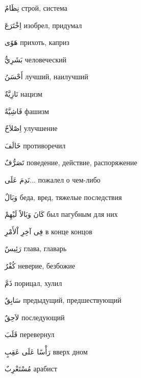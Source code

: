 \documentclass[a5paper]{article}
\newcommand\textstyleDropCaps[1]{#1}
\newcommand\textstyleCaptioncharacters[1]{#1}
\begin{document}
\textstyleCaptioncharacters{نِظَامٌ }\textstyleDropCaps{строй, система‎}

\textstyleCaptioncharacters{اِخْتَرَعَ }\textstyleDropCaps{изобрел, придумал‎}

\textstyleCaptioncharacters{هَوًى }\textstyleDropCaps{прихоть, каприз‎}

\textstyleCaptioncharacters{بَشَرِيٌّ }\textstyleDropCaps{человеческий‎}

\textstyleCaptioncharacters{أَحْسَنُ }\textstyleDropCaps{лучший, наилуч­ший‎}

\textstyleCaptioncharacters{نَازِيَّةٌ }\textstyleDropCaps{нацизм‎}

\textstyleCaptioncharacters{فَاشِيَّةٌ }\textstyleDropCaps{фашизм‎}

\textstyleCaptioncharacters{اِصْلاَحٌ }\textstyleDropCaps{улучшение‎}

\textstyleCaptioncharacters{خَالَفَ }\textstyleDropCaps{противоречил‎}

\textstyleCaptioncharacters{تَصَرُّفٌ }\textstyleDropCaps{поведение, дей­ствие, распоряжение‎}

\textstyleCaptioncharacters{نَدِمَ عَلَى... }\textstyleDropCaps{пожалел о чем-либо‎}

\textstyleCaptioncharacters{وَبَالٌ }\textstyleDropCaps{беда, вред, тяжелые последствия‎}

\textstyleCaptioncharacters{كَانَ وَبَالاً لَيْهِمْ }\textstyleDropCaps{был па­губным для них‎}

\textstyleCaptioncharacters{فِى آخِرِ اْلأَمْرِ }\textstyleDropCaps{в конце концов‎}

\textstyleCaptioncharacters{رَئِيسٌ }\textstyleDropCaps{глава, главарь‎}

\textstyleCaptioncharacters{كُفْرٌ }\textstyleDropCaps{неверие, безбожие‎}

\textstyleCaptioncharacters{ذَمَّ }\textstyleDropCaps{порицал, хулил‎}

\textstyleCaptioncharacters{سَابِقٌ }\textstyleDropCaps{предыдущий, пред­шествующий‎}

\textstyleCaptioncharacters{لاَحِقٌ }\textstyleDropCaps{последующий‎}

\textstyleCaptioncharacters{قَلَبَ }\textstyleDropCaps{перевернул‎}

\textstyleCaptioncharacters{رَأْسًا عَلَى عَقِبٍ }\textstyleDropCaps{вверх дном‎}

\textstyleCaptioncharacters{مُسْتَعْرِبٌ }\textstyleDropCaps{арабист‎}
\end{document}
